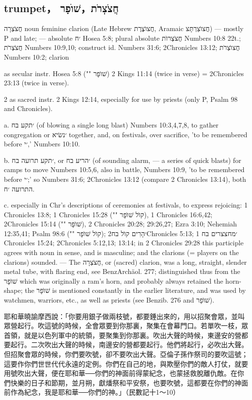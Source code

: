 \subsection{trumpet， חֲצֹצְרֹת，שׁוֺפָר}
חֲצֹצְרָה noun feminine clarion (Late Hebrew חֲצוֺצֶרֶת, Aramaic חֲצוֺצַרְתָּצ) — mostly P and late; — absolute ׳ח Hosea 5:8; plural absolute חֲצֹצְרוֺת Numbers 10:8 22t.; חֲצֹצְרֹת Numbers 10:9,10; construct id. Numbers 31:6; 2Chronicles 13:12; חֲצוֺצְרֹת Numbers 10:2; clarion


as secular instr. Hosea 5:8 ("" שׁוֺפָר) 2 Kings 11:14 (twice in verse) = 2Chronicles 23:13 (twice in verse).

2 as sacred instr. 2 Kings 12:14, especially for use by priests (only P, Psalm 98 and Chronicles).

a. ׳תקע בח (of blowing a single long blast) Numbers 10:3,4,7,8, to gather congregation or ׳נשׂיא together, and, on festivals, over sacrifice, 'to be remembered before ׳י,' Numbers 10:10.

b. ׳תקע תרועה בח, or ׳הריע בח (of sounding alarm, — a series of quick blasts) for camps to move Numbers 10:5,6, also in battle, Numbers 10:9, 'to be remembered before ׳י;' so Numbers 31:6; 2Chronicles 13:12 (compare 2 Chronicles 13:14), both התרועה ׳ח.

c. especially in Chr's descriptions of ceremonies at festivals, to express rejoicing: 1 Chronicles 13:8; 1 Chronicles 15:28 ("" קוֺל שׁוֺפָר), 1 Chronicles 16:6,42; 2Chronicles 15:14 ("" שׁוֺפָר), 2 Chronicles 20:28; 29:26,27; Ezra 3:10; Nehemiah 12:35,41; Psalm 98:6 ("" קוֺל שׁוֺפָר); ׳הָרִים קוֺל בח2Chronicles 5:13; ׳מחצצרים בח 1 Chronicles 15:24; 2Chronicles 5:12,13; 13:14; in 2 Chronicles 29:28 this participle agrees with noun in sense, and is masculine; and the clarions (= players on the clarions) sounded. — The חֲצֹצְרָה, or (sacred) clarion, was a long, straight, slender metal tube, with flaring end, see BenzArchäol. 277; distinguished thus from the שׁוֺפָר which was originally a ram's horn, and probably always retained the horn-shape; the שׁוֺפָר is mentioned constantly in the earlier literature, and was used by watchmen, warriors, etc., as well as priests (see Benzib. 276 and שׁוֺפָר).

耶和華曉諭摩西說：「你要用銀子做兩枝號，都要錘出來的，用以招聚會眾，並叫眾營起行。吹這號的時候，全會眾要到你那裏，聚集在會幕門口。若單吹一枝，眾首領，就是以色列軍中的統領，要聚集到你那裏。吹出大聲的時候，東邊安的營都要起行。二次吹出大聲的時候，南邊安的營都要起行。他們將起行，必吹出大聲。但招聚會眾的時候，你們要吹號，卻不要吹出大聲。亞倫子孫作祭司的要吹這號；這要作你們世世代代永遠的定例。你們在自己的地，與欺壓你們的敵人打仗，就要用號吹出大聲，便在耶和華──你們的神面前得蒙紀念，也蒙拯救脫離仇敵。在你們快樂的日子和節期，並月朔，獻燔祭和平安祭，也要吹號，這都要在你們的神面前作為紀念，我是耶和華──你們的神。」（民數記十1～10）


